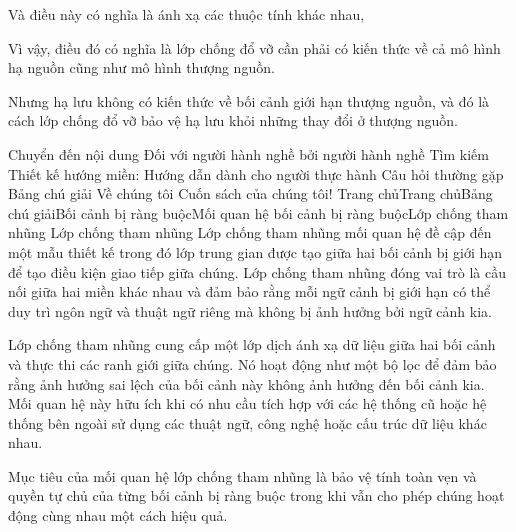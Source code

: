 
Và điều này có nghĩa là ánh xạ các thuộc tính khác nhau,

Vì vậy, điều đó có nghĩa là lớp chống đổ vỡ cần phải có kiến thức về cả mô hình hạ nguồn cũng như mô hình thượng nguồn.

Nhưng hạ lưu không có kiến thức về bối cảnh giới hạn thượng nguồn, và đó là cách lớp chống đổ vỡ bảo vệ hạ lưu khỏi những thay đổi ở thượng nguồn.



Chuyển đến nội dung
Đối với người hành nghề bởi người hành nghề
Tìm kiếm
Thiết kế hướng miền: Hướng dẫn dành cho người thực hành
Câu hỏi thường gặp
Bảng chú giải
Về chúng tôi
Cuốn sách của chúng tôi!
Trang chủTrang chủBảng chú giảiBối cảnh bị ràng buộcMối quan hệ bối cảnh bị ràng buộcLớp chống tham nhũng
Lớp chống tham nhũng
Lớp chống tham nhũng mối quan hệ đề cập đến một mẫu thiết kế trong đó lớp trung gian được tạo giữa hai bối cảnh bị giới hạn để tạo điều kiện giao tiếp giữa chúng. Lớp chống tham nhũng đóng vai trò là cầu nối giữa hai miền khác nhau và đảm bảo rằng mỗi ngữ cảnh bị giới hạn có thể duy trì ngôn ngữ và thuật ngữ riêng mà không bị ảnh hưởng bởi ngữ cảnh kia.

Lớp chống tham nhũng cung cấp một lớp dịch ánh xạ dữ liệu giữa hai bối cảnh và thực thi các ranh giới giữa chúng. Nó hoạt động như một bộ lọc để đảm bảo rằng ảnh hưởng sai lệch của bối cảnh này không ảnh hưởng đến bối cảnh kia. Mối quan hệ này hữu ích khi có nhu cầu tích hợp với các hệ thống cũ hoặc hệ thống bên ngoài sử dụng các thuật ngữ, công nghệ hoặc cấu trúc dữ liệu khác nhau.

Mục tiêu của mối quan hệ lớp chống tham nhũng là bảo vệ tính toàn vẹn và quyền tự chủ của từng bối cảnh bị ràng buộc trong khi vẫn cho phép chúng hoạt động cùng nhau một cách hiệu quả.

